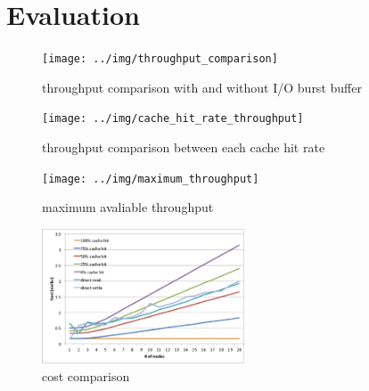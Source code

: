 \section{Evaluation}
\label{sec:evaluation}

\begin{figure}[tb]
	\centering
	\texttt{[image: ../img/throughput\_comparison]}
	\caption{throughput comparison with and without I/O burst buffer}
	\label{throughput comparison}
\end{figure}

\begin{figure}[tb]
	\centering
	\texttt{[image: ../img/cache\_hit\_rate\_throughput]}
	\caption{throughput comparison between each cache hit rate}
	\label{throughput cache rate}
\end{figure}

\begin{figure}[tb]
	\centering
	\texttt{[image: ../img/maximum\_throughput]}
	\caption{maximum avaliable throughput}
	\label{maximum throughput}
\end{figure}

\begin{figure}[tb]
	\centering
	\includegraphics[width=6cm]{../img/cost}
	\caption{cost comparison}
	\label{cost}
\end{figure}


